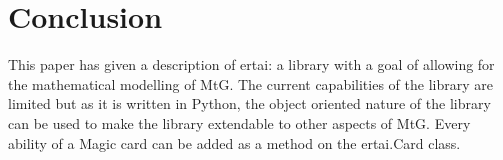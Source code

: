 \documentclass{article}
\begin{document}
\section{Conclusion}
This paper has given a description of ertai: a library with a goal of allowing for the mathematical modelling of MtG. The current capabilities of the library are limited but as it is written in Python, the object oriented nature of the library can be used to make the library extendable to other aspects of MtG. Every ability of a Magic card can be added as a method on the ertai.Card class.



\end{document}
